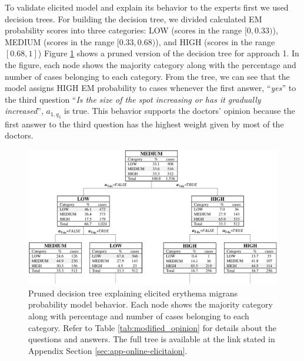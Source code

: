 To validate elicited model and explain its behavior to the experts first we used decision trees. For building the decision tree, we divided calculated EM probability scores into three categories: LOW (scores in the range $[0, 0.33)$), MEDIUM (scores in the range $[0.33, 0.68)$), and HIGH (scores in the range $[0.68, 1]$) Figure \ref{fig:decision_tree} shows a pruned version of the decision tree for approach 1. In the figure, each node shows the majority category along with the percentage and number of cases belonging to each category. From the tree, we can see that the model assigns HIGH EM probability to cases whenever the first answer, \enquote{\textit{yes}} to the third question \enquote{\textit{Is the size of the spot increasing or has it gradually increased}}, \( a_{1,q_{3}}\) is true. This behavior supports the doctors’ opinion because the first answer to the third question has the highest weight given by most of the doctors.
\begin{figure}[htb!]
	\centering
	\includegraphics[width=\textwidth, keepaspectratio]{images/elicitation/decision-tree.pdf}
	\caption[Pruned decision tree explaining elicited erythema migrans probability model behavior]{Pruned decision tree explaining elicited erythema migrans probability model behavior. Each node shows the majority category along with percentage and number of cases belonging to each category. Refer to Table \ref{tab:modified_opinion} for details about the questions and answers. The full tree is available at the link stated in Appendix Section \ref{sec:app-online-elicitaion}.}
	\label{fig:decision_tree}
\end{figure}


